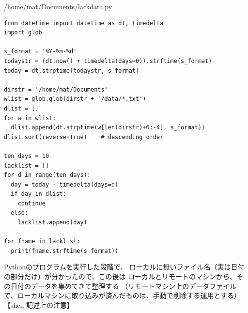 \documentclass[12pt,a4paper,uplatex]{jsarticle}
\begin{document}
\begin{itembox}[l]{/home/mat/Documents/lackdata.py}
	\begin{verbatim}
from datetime import datetime as dt, timedelta
import glob

s_format = '%Y-%m-%d'
todaystr = (dt.now() + timedelta(days=0)).strftime(s_format)
today = dt.strptime(todaystr, s_format)

dirstr = '/home/mat/Documents'
wlist = glob.glob(dirstr + '/data/*.txt')
dlist = []
for w in wlist:
  dlist.append(dt.strptime(w[len(dirstr)+6:-4], s_format))
dlist.sort(reverse=True)	# descending order

ten_days = 10
lacklist = []
for d in range(ten_days):
  day = today - timedelta(days=d)
  if day in dlist:
    continue
  else:
    lacklist.append(day)

for fname in lacklist:
  print(fname.strftime(s_format))
	\end{verbatim}
\end{itembox}

Pythonのプログラムを実行した段階で、
ローカルに無いファイル名（実は日付の部分だけ）が分かったので、この後は
ローカルとリモートのマシンから、その日付のデータを集めてきて整理する
（リモートマシン上のデータファイルで、ローカルマシンに取り込みが済んだものは、手動で削除する運用とする）\\

【shell 記述上の注意】
\end{document}
